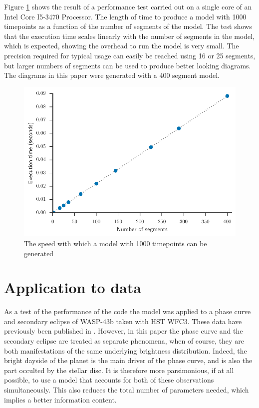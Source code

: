 \documentclass[a4paper,fleqn,usenatbib]{mnras}
\begin{document}
Figure \ref{fig:exec_time} shows the result of a performance test carried out on a single core of an Intel Core I5-3470 Processor. The length of time to produce a model with 1000 timepoints as a function of the number of segments of the model. The test shows that the execution time scales linearly with the number of segments in the model, which is expected, showing the overhead to run the model is very small. The precision required for typical usage can easily be reached using 16 or 25 segments, but larger numbers of segments can be used to produce better looking diagrams. The diagrams in this paper were generated with a 400 segment model.

\begin{figure}
\begin{center}
\includegraphics[width=\columnwidth]{img/exec_time.pdf}
\caption{The speed with which a model with 1000 timepoints can be generated}
\label{fig:exec_time}
\end{center}
\end{figure}

\section{Application to data}\label{sec:Application}

As a test of the performance of the code the model was applied to a phase curve and secondary eclipse of WASP-43b taken with HST WFC3. These data have previously been published in \citet{Stevenson2014}. However, in this paper the phase curve and the secondary eclipse are treated as separate phenomena, when of course, they are both manifestations of the same underlying brightness distribution. Indeed, the bright dayside of the planet is the main driver of the phase curve, and is also the part occulted by the stellar disc. It is therefore more parsimonious, if at all possible, to use a model that accounts for both of these observations simultaneously. This also reduces the total number of parameters needed, which implies a better information content.
\end{document}
